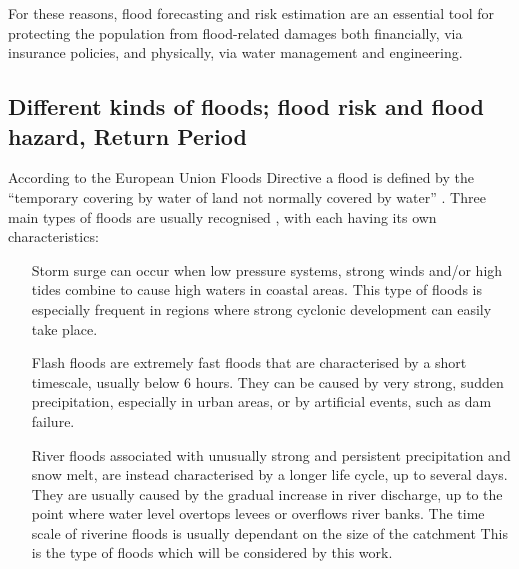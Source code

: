 For these reasons, flood forecasting and risk estimation are an essential tool for protecting the population from flood-related damages both financially, via insurance policies, and physically, via water management and engineering.

\subsection{Different kinds of floods; flood risk and flood hazard, Return Period}
According to the European Union Floods Directive a flood is defined by the \enquote{temporary covering by water of land not normally covered by water} \citep{EUFD2007}.
Three main types of floods are usually recognised \citep[see][]{Kron2005}, with each having its own characteristics:
\begin{itemize}
    \item[Storm surge] can occur when low pressure systems, strong winds and/or high tides combine to cause high waters in coastal areas. This type of floods is especially frequent in regions where strong cyclonic development can easily take place.
    \item[Flash floods] are extremely fast floods that are characterised by a short timescale, usually below 6 hours. They can be caused by very strong, sudden precipitation, especially in urban areas, or by artificial events, such as dam failure.
    \item[River floods] associated with unusually strong and persistent precipitation and snow melt, are instead characterised by a longer life cycle, up to several days. They are usually caused by the gradual increase in river discharge, up to the point where water level overtops levees or overflows river banks. The time scale of riverine floods is usually dependant on the size of the catchment This is the type of floods which will be considered by this work.
\end{itemize}

